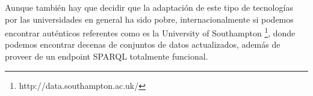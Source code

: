 \bigskip
Aunque también hay que decidir que la adaptación de este tipo de tecnologías por las universidades en general ha sido pobre, internacionalmente si podemos encontrar auténticos referentes como es la University of Southampton \footnote{http://data.southampton.ac.uk/}, donde podemos encontrar decenas de conjuntos de datos actualizados, además de proveer de un endpoint SPARQL totalmente funcional.